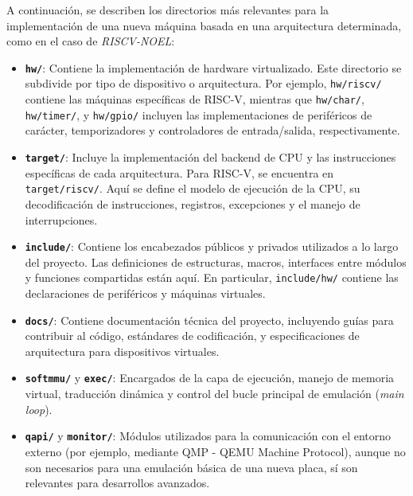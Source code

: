 A continuación, se describen los directorios más relevantes para la implementación de una nueva máquina basada en una arquitectura determinada, como en el caso de \textit{RISCV-NOEL}:

\begin{itemize}
  \item \textbf{\texttt{hw/}}: Contiene la implementación de hardware virtualizado. Este directorio se subdivide por tipo de dispositivo o arquitectura. Por ejemplo, \texttt{hw/riscv/} contiene las máquinas específicas de RISC-V, mientras que \texttt{hw/char/}, \texttt{hw/timer/}, y \texttt{hw/gpio/} incluyen las implementaciones de periféricos de carácter, temporizadores y controladores de entrada/salida, respectivamente.

  \item \textbf{\texttt{target/}}: Incluye la implementación del backend de CPU y las instrucciones específicas de cada arquitectura. Para RISC-V, se encuentra en \texttt{target/riscv/}. Aquí se define el modelo de ejecución de la CPU, su decodificación de instrucciones, registros, excepciones y el manejo de interrupciones.

  \item \textbf{\texttt{include/}}: Contiene los encabezados públicos y privados utilizados a lo largo del proyecto. Las definiciones de estructuras, macros, interfaces entre módulos y funciones compartidas están aquí. En particular, \texttt{include/hw/} contiene las declaraciones de periféricos y máquinas virtuales.

  \item \textbf{\texttt{docs/}}: Contiene documentación técnica del proyecto, incluyendo guías para contribuir al código, estándares de codificación, y especificaciones de arquitectura para dispositivos virtuales.

  \item \textbf{\texttt{softmmu/}} y \textbf{\texttt{exec/}}: Encargados de la capa de ejecución, manejo de memoria virtual, traducción dinámica y control del bucle principal de emulación (\textit{main loop}).

  \item \textbf{\texttt{qapi/}} y \textbf{\texttt{monitor/}}: Módulos utilizados para la comunicación con el entorno externo (por ejemplo, mediante QMP - QEMU Machine Protocol), aunque no son necesarios para una emulación básica de una nueva placa, sí son relevantes para desarrollos avanzados.
\end{itemize}

